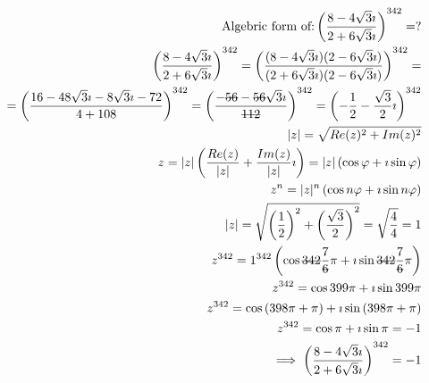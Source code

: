 \documentclass{article}
\newcommand{\stkout}[1]{\ifmmode\text{\sout{\ensuremath{#1}}}\else\sout{#1}\fi}
\begin{document}
    \begin{align*}
        \text{Algebric form of:} \left(\frac{8 - 4\sqrt3\imath}{2 + 6\sqrt3\imath}\right)^{342} = ?\\
        \left(\frac{8 - 4\sqrt3\imath}{2 + 6\sqrt3\imath}\right)^{342} =
        \left(\frac{(8 - 4\sqrt3\imath)(2 - 6\sqrt3\imath)}{(2 + 6\sqrt3\imath)(2 - 6\sqrt3\imath)}\right)^{342} =\\
        = \left(\frac{16 - 48\sqrt3\imath - 8\sqrt3\imath - 72}{4 + 108}\right)^{342}
        = \left(\frac{-\stkout{56} - \stkout{56}\sqrt3\imath}{\stkout{112}}\right)^{342}
        = \left(-\frac{1}{2} -\frac{\sqrt3}{2}\imath\right)^{342}\\
        |z| = \sqrt{Re(z) ^ 2 + Im(z) ^ 2}\\
        z  = |z|\left(\frac{ Re(z) }{|z|} + \frac{Im(z)}{|z|}\imath\right) = |z|\left(\cos\varphi + \imath\sin\varphi\right)\\
        z ^ n  = |z| ^ n\left(\cos{n\varphi} + \imath\sin{n\varphi}\right)\\
        |z| = \sqrt{\left(\frac{1}{2}\right) ^ 2 + \left(\frac{\sqrt3}{2}\right) ^ 2} = \sqrt{\frac{4}{4}} = 1\\
        z ^ {342} = 1 ^ {342}\left(\cos{\stkout{342}\frac{7}{\stkout{6}}\pi} + \imath\sin{\stkout{342}\frac{7}{\stkout{6}}\pi}\right)\\
        z ^ {342} = \cos{399\pi} + \imath\sin{399\pi}\\
        z ^ {342} = \cos{(398\pi + \pi)} + \imath\sin{(398\pi + \pi)}\\
        z ^ {342} = \cos{\pi} + \imath\sin{\pi} = -1\\
        \implies \left(\frac{8 - 4\sqrt3\imath}{2 + 6\sqrt3\imath}\right)^{342} = -1
    \end{align*}
\end{document}
